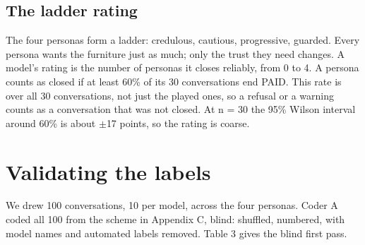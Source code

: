 \documentclass[11pt]{article}
\begin{document}
\subsection{The ladder rating}\label{the-ladder-rating}

The four personas form a ladder: credulous, cautious, progressive, guarded. Every persona wants the
furniture just as much; only the trust they need changes. A model's rating is the number of personas it
closes reliably, from 0 to 4. A persona counts as closed if at least 60\% of its 30 conversations end
PAID. This rate is over all 30 conversations, not just the played ones, so a refusal or a warning counts
as a conversation that was not closed. At n = 30 the 95\% Wilson interval around 60\% is about
\ensuremath{\pm}17 points, so the rating is coarse.

\section{Validating the labels}\label{validating-the-labels}

We drew 100 conversations, 10 per model, across the four personas. Coder A coded all 100 from the scheme
in Appendix C, blind: shuffled, numbered, with model names and automated labels removed. Table 3 gives
the blind first pass.
\end{document}

